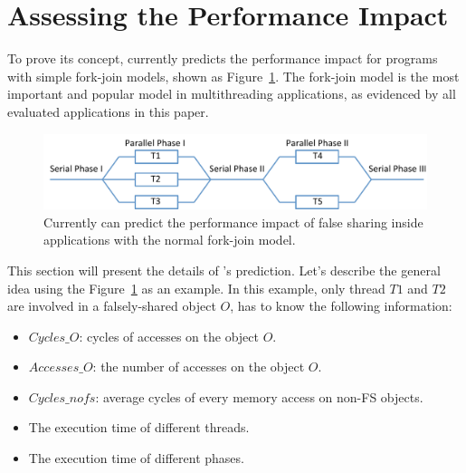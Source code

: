 \section{Assessing the Performance Impact}

\label{sec:predictimprove}


To prove its concept, \cheetah{} currently predicts the performance impact for programs with simple fork-join models, shown as Figure~\ref{fig:forkjoinmodel}. 
The fork-join model is the most important and popular model in multithreading applications, as evidenced by all evaluated applications in this paper. 

\begin{figure}[ht!]
\begin{center}
\includegraphics[width=6.5in]{figure/forkjoin}
\end{center}
\caption{Currently \Cheetah{} can predict the performance impact of false sharing inside applications with the normal fork-join model.
\label{fig:forkjoinmodel}}
\end{figure}



This section will present the details of \cheetah{}'s prediction. Let's describe the general idea using the Figure~\ref{fig:forkjoinmodel} as an example. In this example, only thread $T1$ and $T2$ are involved in a falsely-shared object $O$, \cheetah{} has to know the following information:

\begin{itemize}
\item $Cycles\_O$: cycles of accesses on the object $O$.
\item $Accesses\_O$: the number of accesses on the object $O$.  
\item $Cycles\_{nofs}$: average cycles of every memory access on non-FS objects. 
\item The execution time of different threads.  
\item The execution time of different phases. 
\end{itemize}

